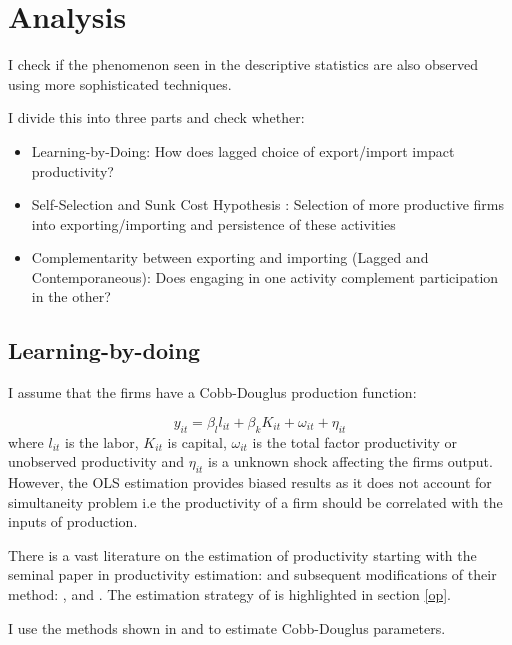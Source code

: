 \documentclass[11pt]{article}
\begin{document}
\section{ Analysis}
I check if the phenomenon seen
in the descriptive statistics are also observed using more sophisticated
techniques. 

I divide this into three parts and check whether: 
\begin{itemize}
\item Learning-by-Doing: How does lagged choice of export/import
  impact productivity?
\item Self-Selection and Sunk Cost Hypothesis : Selection of more productive firms into
  exporting/importing and persistence of these activities
\item Complementarity between exporting and importing (Lagged and
  Contemporaneous): Does engaging
  in one activity complement participation in the other?
\end{itemize}

\subsection{Learning-by-doing}

 I assume that the firms have a Cobb-Douglus
production function: 

\begin{equation}
y_{it} =   \beta_{l}l_{it} + \beta_{k}K_{it} +
\omega_{it} + \eta_{it} 
\end{equation}
where $l_{it}$ is the labor, $K_{it}$ is capital, $\omega_{it}$ is the
total factor productivity or unobserved productivity and $\eta_{it}$
is a unknown shock affecting the firms output. However, the OLS
estimation provides biased results as it does not account for
simultaneity problem i.e the productivity of a firm should be
correlated with the inputs of production. 

There is a vast literature on the estimation of productivity starting
with the seminal paper in productivity estimation: \textcite{olley1992dynamics} and subsequent
modifications of their method: \textcite{levinsohn2003estimating},
\textcite{ackerberg2006structural} and
\textcite{wooldridge2009estimating}. The estimation strategy of
\textcite{olley1992dynamics} is highlighted in section \ref{op}. 

I use the  methods shown in \textcite{levinsohn2003estimating} and
\textcite{ackerberg2006structural} to estimate Cobb-Douglus
parameters. 
\end{document}
